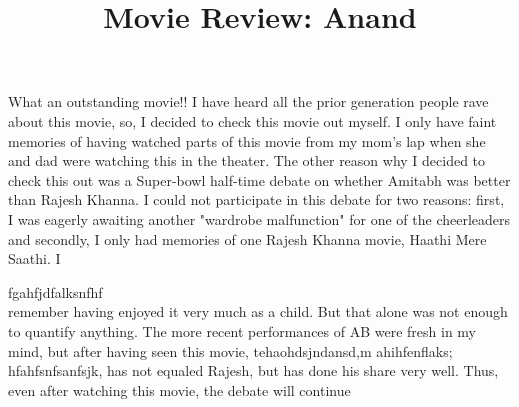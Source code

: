 \documentclass[12pt, a4paper]{article}
\title{Movie Review: Anand}
\author{}
\date{}
\begin{document}
\maketitle
What an outstanding movie!! I have heard all the prior generation people rave about this movie, so, I decided to check this movie out myself. I only have faint memories of having watched parts of this movie from my mom's lap when she and dad were watching this in the theater. The other reason why I decided to check this out was a Super-bowl half-time debate on whether Amitabh was better than Rajesh Khanna. I could not participate in this debate for two reasons: first, I was eagerly awaiting another "wardrobe malfunction" for one of the cheerleaders and secondly, I only had memories of one Rajesh Khanna movie, Haathi Mere Saathi. I

fgahfjdfalksnfhf\\

remember having enjoyed it very much as a child. But that alone was not enough to quantify anything. The more recent performances of AB were fresh in my mind, but after having seen this movie, tehaohdsjndansd,m  ahihfenflaks;  hfahfsnfsanfsjk, has not equaled Rajesh, but has done his share very well. Thus, even after watching this movie, the debate will continue \par
\end{document}
